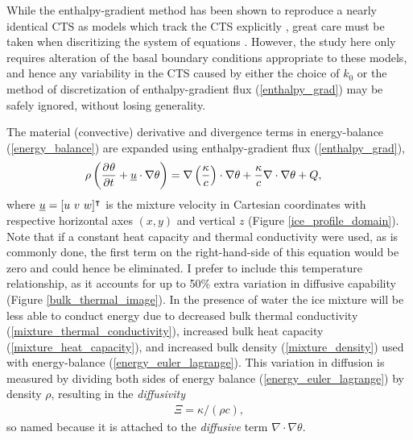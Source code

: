 While the enthalpy-gradient method has been shown to reproduce a nearly identical CTS as models which track the CTS explicitly \citep{kleiner_2015}, great care must be taken when discritizing the system of equations \citep{blatter_2015}.  However, the study here only requires alteration of the basal boundary conditions appropriate to these models, and hence any variability in the CTS caused by either the choice of $k_0$ or the method of discretization of enthalpy-gradient flux (\ref{enthalpy_grad}) may be safely ignored, without losing generality.

The material (convective) derivative and divergence terms in energy-balance (\ref{energy_balance}) are expanded using enthalpy-gradient flux (\ref{enthalpy_grad}),
\begin{align}
  \label{energy_euler_lagrange}
  \rho \left( \frac{\partial^{} \theta}{\partial t^{} } + \underline{u} \cdot \nabla \theta \right) &= \nabla \left( \frac{\kappa}{c} \right) \cdot \nabla \theta + \frac{\kappa}{c} \nabla \cdot \nabla \theta + Q,
\end{align}
where $\underline{u} = [u\ v\ w]^\intercal$ is the mixture velocity in Cartesian coordinates with respective horizontal axes $(x,y)$ and vertical $z$ (Figure \ref{ice_profile_domain}).  Note that if a constant heat capacity and thermal conductivity were used, as is commonly done, the first term on the right-hand-side of this equation would be zero and could hence be eliminated.  I prefer to include this temperature relationship, as it accounts for up to 50\% extra variation in diffusive capability (Figure \ref{bulk_thermal_image}).  In the presence of water the ice mixture will be less able to conduct energy due to decreased bulk thermal conductivity (\ref{mixture_thermal_conductivity}), increased bulk heat capacity (\ref{mixture_heat_capacity}), and increased bulk density (\ref{mixture_density}) used with energy-balance (\ref{energy_euler_lagrange}).  This variation in diffusion is measured by dividing both sides of energy balance (\ref{energy_euler_lagrange}) by density $\rho$, resulting in the  \emph{diffusivity}
\begin{align}
  \label{diffusivity}
  \Xi=\kappa/(\rho c),
\end{align}
so named because it is attached to the \emph{diffusive} term $\nabla \cdot \nabla \theta$.

